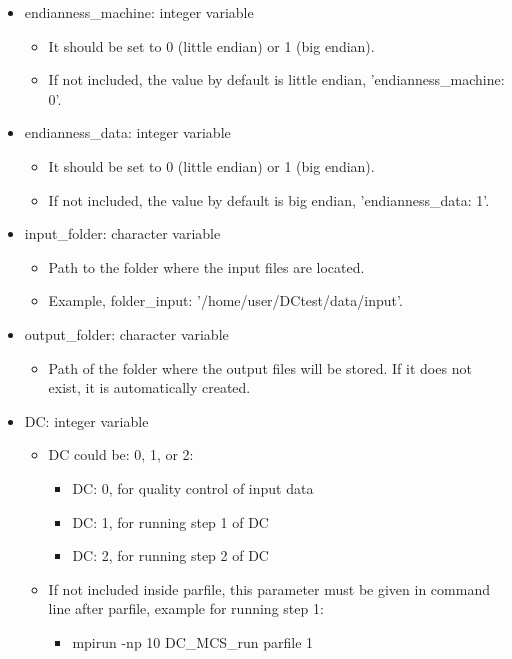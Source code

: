 \documentclass[11pt, oneside]{article}   	%
\begin{document}
\begin{itemize}

 \item endianness\_machine: integer variable
	\begin{itemize}
	\item It should be set to 0 (little endian) or 1 (big endian).
	\item If not included, the value by default is little endian, 'endianness\_machine: 0'.
	\end{itemize}

 \item endianness\_data: integer variable 
	\begin{itemize}
	\item It should be set to 0 (little endian) or 1 (big endian).
	\item If not included, the value by default is big endian, 'endianness\_data: 1'.
	\end{itemize}

\item input\_folder: character variable
	\begin{itemize}
	\item Path to the folder where the input files are located.
	\item Example, folder\_input:  '/home/user/DCtest/data/input'.
	\end{itemize}

\item output\_folder: character variable
	\begin{itemize}
	\item Path of the folder where the output files will be stored. If it does not exist, it is automatically created.
	\end{itemize}
	
\item DC: integer variable 
	\begin{itemize}
	\item DC could be: 0, 1, or 2:
		\begin{itemize}
		\item DC: 0, for quality control of input data 
		\item DC: 1, for running step 1 of DC 
		\item DC: 2, for running step 2 of DC
		\end{itemize}
	\item If not included inside parfile, this parameter must be given in command line after parfile, example for running step 1: 
		\begin{itemize}
		\item mpirun -np 10 DC\_MCS\_run parfile 1
		\end{itemize}
	\end{itemize}
	

\end{itemize}
\end{document}
